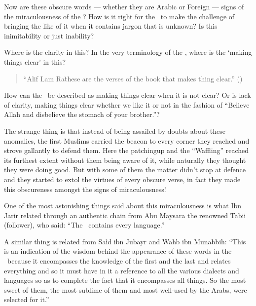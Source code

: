 \documentclass[12pt]{memoir}
\renewcommand\pardivider{\centerline{\ar{۞۞۞}}}
\begin{document}
\pardivider

Now are these obscure words — whether they are Arabic or Foreign —
signs of the miraculousness of the \Quran?
How is it right for the \Quran\ to make the challenge of bringing
the like of it when it contains jargon that is unknown?
Is this inimitability or just inability?

Where is the clarity in this? In the very terminology of the \Quran,
where is the ‘making things clear’ in this?

\begin{quote}
“Alif Lam Ra\` these are the verses of the book that makes thing clear.”
()
\end{quote}

How can the \Quran\ be described as making things clear when it is not clear?
Or is lack of clarity, making things clear
whether we like it or not in the fashion of
“Believe Allah and disbelieve the stomach of your brother.”?\fnmarksym[*]


The strange thing is that instead of being assailed by doubts
about these anomalies, the first Muslims carried the beacon to every corner
they reached and strove gallantly to defend them.
Here the patching\–up and the “Waffling” reached its furthest extent
without them being aware of it,
while naturally they thought they were doing good.
But with some of them the matter didn’t stop at defence and they started
to extol the virtues of every obscure verse,
in fact they made this obscureness amongst the signs of miraculousness!

One of the most astonishing things said about this miraculousness is what
Ibn Jarir related through an authentic chain from Abu Maysara
the renowned Tabi\´i (follower), who said:
“The \Quran\ contains every language.”\fnmark


A similar thing is related from Sa\`id ibn Jubayr and Wahb ibn Munabbih:
“This is an indication of the wisdom behind the appearance of these words
in the \Quran\ because it encompasses the knowledge of the first
and the last and relates everything and so it must have in it a reference
to all the various dialects and languages so as to complete the fact
that it encompasses all things. So the most sweet of them,
the most sublime of them and most well-used by the Arabs,
were selected for it.”\fnmark

\end{document}
